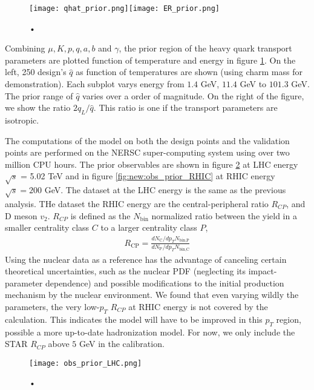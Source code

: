\begin{figure}
\centering
\texttt{[image: qhat\_prior.png]}\texttt{[image: ER\_prior.png]}
\caption{•}
\label{fig:new:design-qhat}
\end{figure}

Combining $\mu, K, p, q, a, b$ and $\gamma$, the prior region of the heavy quark transport parameters are plotted function of temperature and energy in figure \ref{fig:new:design-qhat}. 
On the left, 250 design's $\hat{q}$ as function of temperatures are shown  (using charm mass for demonstration).
Each subplot varys energy from $1.4$ GeV, $11.4$ GeV to $101.3$ GeV.
The prior range of $\hat{q}$ varies over a order of magnitude.
On the right of the figure, we show the ratio $2\hat{q}_L/\hat{q}$. 
This ratio is one if the transport parameters are isotropic.


The computations of the model on both the design points and the validation points are performed on the NERSC super-computing system using over two million CPU hours.
The prior observables are shown in figure \ref{fig:new:obs_prior_LHC} at LHC energy $\sqrt{s}$ = 5.02 TeV and in figure \ref{fig:new:obs_prior_RHIC} at RHIC energy $\sqrt{s} = 200$ GeV.
The dataset at the LHC energy is the same as the previous analysis.
THe dataset the RHIC energy are the central-peripheral ratio $R_{CP}$, and D meson $v_2$. 
$R_{CP}$ is defined as the $N_{\textrm{bin}}$ normalized ratio between the yield in a smaller centrality class $C$ to a larger centrality class $P$,
\begin{eqnarray}
R_{\textrm{CP}} = \frac{dN_\textrm{C}/dp_T N_{\textrm{bin,P}}}{dN_\textrm{P}/dp_T N_{\textrm{bin,C}}}
\end{eqnarray}
Using the nuclear data as a reference has the advantage of canceling certain theoretical uncertainties, such as the nuclear PDF (neglecting its impact-parameter dependence) and possible modifications to the initial production mechanism by the nuclear environment.
We found that even varying wildly the parameters, the very low-$p_T$ $R_{CP}$ at RHIC energy is not covered by the calculation. 
This indicates the model will have to be improved in this $p_T$ region, possible a more up-to-date hadronization model.
For now, we only include the STAR $R_{CP}$ above $5$ GeV in the calibration.

\begin{figure}
\centering
\texttt{[image: obs\_prior\_LHC.png]}
\caption{•}
\label{fig:new:obs_prior_LHC}
\end{figure}

